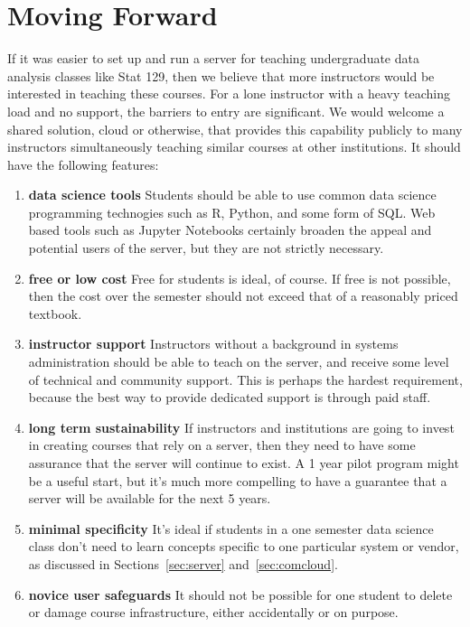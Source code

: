 \documentclass[12pt]{article}
\begin{document}
\section{Moving Forward}

If it was easier to set up and run a server for teaching undergraduate data analysis classes like Stat 129, then we believe that more instructors would be interested in teaching these courses.
For a lone instructor with a heavy teaching load and no support, the barriers to entry are significant.
We would welcome a shared solution, cloud or otherwise, that provides this capability publicly to many instructors simultaneously teaching similar courses at other institutions.
It should have the following features:
\begin{enumerate}
\item \textbf{data science tools} Students should be able to use common data science programming technogies such as R, Python, and some form of SQL.
    Web based tools such as Jupyter Notebooks certainly broaden the appeal and potential users of the server, but they are not strictly necessary.
\item \textbf{free or low cost} Free for students is ideal, of course.
    If free is not possible, then the cost over the semester should not exceed that of a reasonably priced textbook.
\item \textbf{instructor support}
    Instructors without a background in systems administration should be able to teach on the server, and receive some level of technical and community support.
    This is perhaps the hardest requirement, because the best way to provide dedicated support is through paid staff.
\item \textbf{long term sustainability} 
    If instructors and institutions are going to invest in creating courses that rely on a server, then they need to have some assurance that the server will continue to exist.
    A 1 year pilot program might be a useful start, but it's much more compelling to have a guarantee that a server will be available for the next 5 years.
\item \textbf{minimal specificity}
    It's ideal if students in a one semester data science class don't need to learn concepts specific to one particular system or vendor, as discussed in Sections~\ref{sec:server} and~\ref{sec:comcloud}.
\item \textbf{novice user safeguards} It should not be possible for one student to delete or damage course infrastructure, either accidentally or on purpose.

\end{enumerate}
\end{document}
